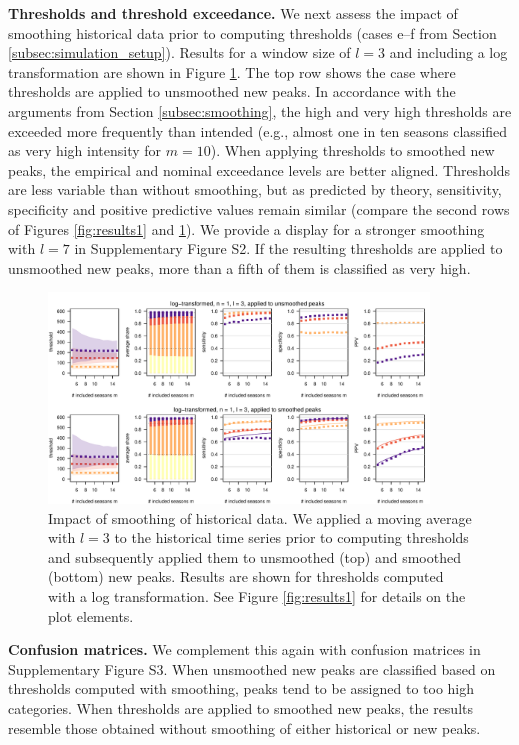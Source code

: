 \documentclass[12pt]{article}
\begin{document}
\textbf{Thresholds and threshold exceedance.} We next assess the impact of smoothing historical data prior to computing thresholds (cases e--f from Section \ref{subsec:simulation_setup}). Results for a window size of $l = 3$ and including a log transformation are shown in Figure \ref{fig:results_smoothing}. The top row shows the case where thresholds are applied to unsmoothed new peaks. In accordance with the arguments from Section \ref{subsec:smoothing}, the high and very high thresholds are exceeded more frequently than intended (e.g., almost one in ten seasons classified as very high intensity for $m = 10$). When applying thresholds to smoothed new peaks, the empirical and nominal exceedance levels are better aligned. Thresholds are less variable than without smoothing, but as predicted by theory, sensitivity, specificity and positive predictive values remain similar (compare the second rows of Figures \ref{fig:results1} and \ref{fig:results_smoothing}). We provide a display for a stronger smoothing with $l = 7$ in Supplementary Figure S2. If the resulting thresholds are applied to unsmoothed new peaks, more than a fifth of them is classified as very high.

\begin{figure}[h!]
\centering
\includegraphics[width=0.9\textwidth]{figure/plot_smoothing3_fr_small.pdf}

\caption{Impact of smoothing of historical data. We applied a moving average with $l = 3$ to the historical time series prior to computing thresholds and subsequently applied them to unsmoothed (top) and smoothed (bottom) new peaks. Results are shown for thresholds computed with a log transformation. See Figure \ref{fig:results1} for details on the plot elements.}
\label{fig:results_smoothing}
\end{figure}


\textbf{Confusion matrices.} We complement this again with confusion matrices in Supplementary Figure S3. When unsmoothed new peaks are classified based on thresholds computed with smoothing, peaks tend to be assigned to too high categories. When thresholds are applied to smoothed new peaks, the results resemble those obtained without smoothing of either historical or new peaks.
\end{document}

